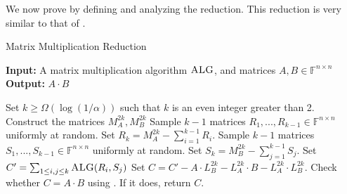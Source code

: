 \documentclass[12pt]{caltech_thesis}
\def\F{\mathbb{F}}
\begin{document}
We now prove  by defining and analyzing the reduction. This reduction is very similar to that of \cite{asadi2022worstcase}.

\begin{algorithm}
    \caption{Matrix Multiplication Reduction}\label{alg:mat}
\textbf{Input:} A matrix multiplication algorithm $\textsc{ALG}$, and matrices $A,B \in \F^{n \times n}$\\
\textbf{Output:} $A \cdot B$
\begin{algorithmic}[1]

\State Set $k \geq \Omega(\log(1/\alpha))$ such that $k$ is an even integer greater than 2.
\State Construct the matrices $M^{2k}_A, M^{2k}_B$
\State Sample $k-1$ matrices $R_1, ..., R_{k-1} \in \F^{n \times n}$ uniformly at random. Set $R_k = M^{2k}_A - \sum_{i=1}^{k-1}R_i$.
\State Sample $k-1$ matrices $S_1, ..., S_{k-1} \in \F^{n \times n}$ uniformly at random. Set $S_k = M^{2k}_B - \sum_{j=1}^{k-1}S_j$.
\State Set $C' = \sum_{1 \leq i,j \leq k}\textsc{ALG}(R_i,S_j)$
\State Set $C = C' - A\cdot L^{2k}_B - L^{2k}_A\cdot B - L^{2k}_A \cdot L^{2k}_B$.
\State Check whether $C = A \cdot B$ using . If it does, return $C$.
\end{algorithmic}
\end{algorithm}
\end{document}
